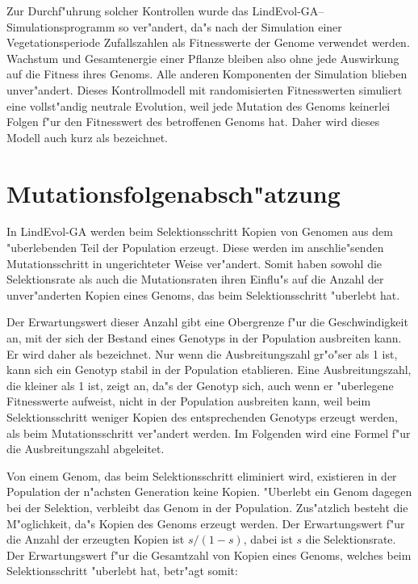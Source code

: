 Zur Durchf"uhrung solcher Kontrollen wurde das LindEvol-GA--Simulationsprogramm
so ver"andert, da"s nach der Simulation einer Vegetationsperiode Zufallszahlen
als Fitnesswerte der Genome verwendet werden. Wachstum und Gesamtenergie einer
Pflanze bleiben also ohne jede Auswirkung auf die Fitness ihres Genoms. Alle anderen
Komponenten der Simulation blieben unver"andert. Dieses Kontrollmodell mit
randomisierten Fitnesswerten simuliert eine vollst"andig neutrale Evolution,
weil jede Mutation des Genoms keinerlei Folgen f"ur den Fitnesswert des
betroffenen Genoms hat. Daher wird dieses Modell auch kurz als  bezeichnet.



\section{Mutationsfolgenabsch"atzung}
\label{mutconsequences}

In LindEvol-GA werden beim Selektionsschritt Kopien von Genomen aus dem "uberlebenden
Teil der Population erzeugt. Diese werden im anschlie"senden Mutationsschritt in ungerichteter
Weise ver"andert. Somit haben sowohl die Selektionsrate als auch die Mutationsraten ihren
Einflu"s auf die Anzahl der unver"anderten Kopien eines Genoms, das beim Selektionsschritt
"uberlebt hat.

Der Erwartungswert dieser Anzahl gibt eine Obergrenze f"ur die Geschwindigkeit an, mit der
sich der Bestand eines Genotyps in der Population ausbreiten kann. Er wird daher als
 bezeichnet. Nur wenn die Ausbreitungszahl gr"o"ser als 1 ist,
kann sich ein Genotyp stabil in der Population etablieren. Eine Ausbreitungszahl, die kleiner
als 1 ist, zeigt an, da"s der Genotyp sich, auch wenn er "uberlegene Fitnesswerte aufweist,
nicht in der Population ausbreiten kann, weil beim Selektionsschritt weniger Kopien des
entsprechenden Genotyps erzeugt werden, als beim Mutationsschritt ver"andert werden.
Im Folgenden wird eine Formel f"ur die Ausbreitungszahl abgeleitet.

Von einem Genom, das beim Selektionsschritt eliminiert wird, existieren in der Population
der n"achsten Generation keine Kopien. "Uberlebt ein Genom dagegen bei der Selektion,
verbleibt das Genom in der Population. Zus"atzlich besteht die M"oglichkeit, da"s Kopien
des Genoms erzeugt werden. Der Erwartungswert f"ur die Anzahl der erzeugten Kopien ist
$s/(1-s)$, dabei ist $s$ die Selektionsrate. Der Erwartungswert f"ur die Gesamtzahl von
Kopien eines Genoms, welches beim Selektionsschritt "uberlebt hat, betr"agt somit:

